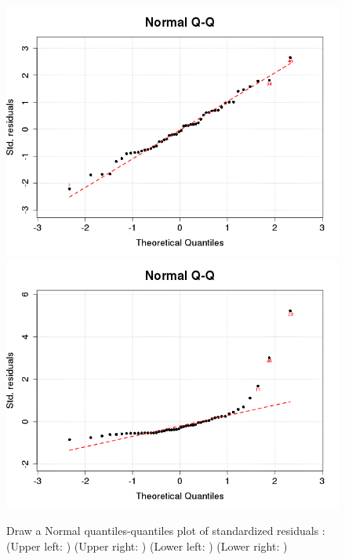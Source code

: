 \begin{figure}[p]
\begin{center}
    \includegraphics[scale=0.4]{imgOT/model1-drawQQplot.png}\hspace*{1cm}
	\includegraphics[scale=0.4]{imgOT/model2-drawQQplot.png}\\
  \end{center}
  \caption{Draw a Normal quantiles-quantiles plot of standardized residuals : \newline
  (Upper left: \textbf{\color{black}{model1: R output}}) (Upper right: \textbf{\color{black}{model2: R output}}) \newline
  (Lower left: \textbf{\color{blue}{model1: python output}})  (Lower right: \textbf{\color{blue}{model2: python output}}) }
\end{figure}


